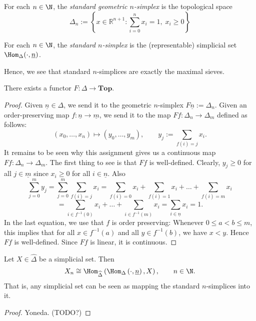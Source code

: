 \begin{definition}
For each $n \in \N$, the \emph{standard geometric $n$-simplex} is the topological space
\[ \Delta_n := \left\{ x \in \mathbb{R}^{n+1} : \sum_{i=0}^n x_i = 1,\; x_i \geq 0 \right\} \]
\end{definition}

\begin{definition}
For each $n \in \N$, the \emph{standard $n$-simplex} is the (representable) simplicial set $\Hom_{\Delta}(\cdot, \underline{n})$.
\end{definition}

Hence, we see that standard $n$-simplices are exactly the maximal sieves.

\begin{lemma}
There exists a functor $F: \Delta \to \mathbf{Top}$.
\end{lemma}
\begin{proof}
Given $\underline{n} \in \Delta$, we send it to the geometric $n$-simplex $ F \underline{n} := \Delta_n$. Given an order-preserving map $f : \underline{n} \to \underline{m}$, we send it to the map $Ff : \Delta_n \to \Delta_m$ defined as follows:
\[ \left( x_0,\ldots,x_n \right) \mapsto \left( y_0, \ldots, y_m \right), \qquad y_j := \sum_{f(i) = j}x_i. \]
It remains to be seen why this assignment gives us a continuous map $Ff : \Delta_n \to \Delta_m$.
The first thing to see is that $Ff$ is well-defined. Clearly, $y_j \geq 0$ for all $j \in \underline{m}$ since $x_i \geq 0$ for all $i \in \underline{n}$. Also
\[ \sum_{j=0}^m y_j = \sum_{j=0}^m \sum_{f(i) = j} x_i = \sum_{f(i)=0}x_i + \sum_{f(i)=1}x_i + \ldots + \sum_{f(i)=m}x_i \]
\[ = \sum_{i \in f^{-1}(0)}x_i + \ldots + \sum_{i \in f^{-1}(m)}x_i = \sum_{i \in \underline{n}}x_i = 1. \]
In the last equation, we use that $f$ is order preserving: Whenever $0 \leq a < b \leq m$, this implies that for all $x \in f^{-1}(a)$ and all $y \in f^{-1}(b)$, we have $x < y$. Hence $Ff$ is well-defined. Since $Ff$ is linear, it is continuous.
\end{proof}

\begin{lemma}
Let $X \in \widehat{\Delta}$ be a simplicial set. Then
\[ X_n \cong \Hom_{\widehat{\Delta}}\left( \Hom_{\Delta}\left( \cdot, \underline{n} \right), X \right), \qquad n \in \N. \]
That is, any simplicial set can be seen as mapping the standard $n$-simplices into it.
\end{lemma}
\begin{proof}
Yoneda. (TODO?)
\end{proof}

